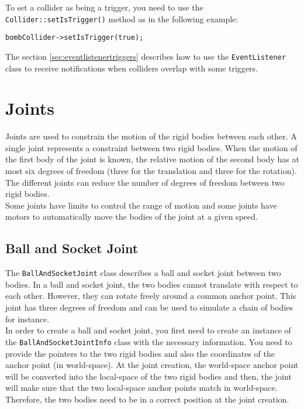 \documentclass[a4paper,12pt]{article}
\begin{document}
    To set a collider as being a trigger, you need to use the \texttt{Collider::setIsTrigger()} method as in the following example: \\

    \begin{lstlisting}
bombCollider->setIsTrigger(true);
   \end{lstlisting}

  
   \vspace{0.6cm}

   The section \ref{sec:eventlistenertriggers} describes how to use the \texttt{EventListener} class to receive notifications when colliders overlap
   with some triggers.
    
    \section{Joints}

    Joints are used to constrain the motion of the rigid bodies between each other. A single joint represents a constraint between two rigid bodies.
    When the motion of the first body of the joint is known, the relative motion of the second body has at most six degrees of freedom (three for the
    translation and three for the rotation). The different joints can reduce the number of degrees of freedom between two rigid bodies. \\

    Some joints have limits to control the range of motion and some joints have motors to automatically move the bodies of the joint at a given speed. \\

    \subsection{Ball and Socket Joint}

    The \texttt{BallAndSocketJoint} class describes a ball and socket joint between two bodies. In a ball and socket joint, the two bodies cannot translate with respect to each other.
    However, they can rotate freely around a common anchor point. This joint has three degrees of freedom and can be used to simulate a chain of bodies for instance. \\

    In order to create a ball and socket joint, you first need to create an instance of the \texttt{BallAndSocketJointInfo} class with the necessary information. You need to provide the pointers to the
    two rigid bodies and also the coordinates of the anchor point (in world-space). At the joint creation, the world-space anchor point will be converted into the local-space of the two rigid
    bodies and then, the joint will make sure that the two local-space anchor points match in world-space. Therefore, the two bodies need to be in a correct position at the joint creation. \\
\end{document}
